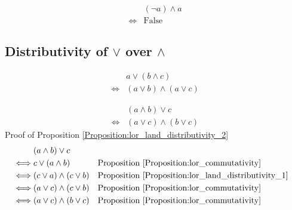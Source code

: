 \begin{prop}
\label{Proposition:land_complement_2}
\begin{align*}
& (\lnot a) \land a \\
\iff & \text{False}
\end{align*}
\end{prop}

\subsection{Distributivity of $\lor$ over $\land$}
\begin{prop}
\label{Proposition:lor_land_distributivity_1}
\begin{align*}
& a \lor (b \land c) \\
\iff & (a \lor b) \land (a \lor c)
\end{align*}
\end{prop}

\begin{prop}
\label{Proposition:lor_land_distributivity_2}
\begin{align*}
& (a \land b) \lor c \\
\iff & (a \lor c) \land (b \lor c)
\end{align*}
Proof of Proposition \ref{Proposition:lor_land_distributivity_2}
\begin{align*}
& (a \land b) \lor c \\
\iff & c \lor (a \land b)
& & \text{Proposition \ref{Proposition:lor_commutativity}} \\
\iff & (c \lor a) \land (c \lor b)
& & \text{Proposition \ref{Proposition:lor_land_distributivity_1}} \\
\iff & (a \lor c) \land (c \lor b)
& & \text{Proposition \ref{Proposition:lor_commutativity}} \\
\iff & (a \lor c) \land (b \lor c)
& & \text{Proposition \ref{Proposition:lor_commutativity}} \\
\end{align*}
\end{prop}

